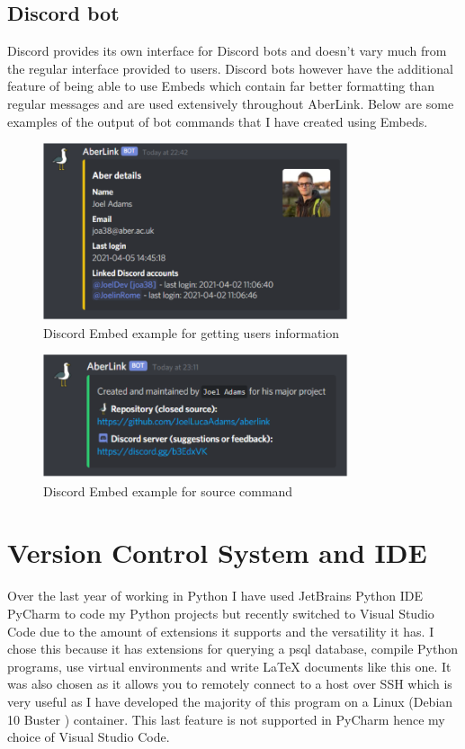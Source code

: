 \subsection{Discord bot}
Discord provides its own interface for Discord bots and doesn't vary much from the regular interface provided to users. Discord bots however have the additional feature of being able to use Embeds which contain far better formatting than regular messages and are used extensively throughout AberLink. Below are some examples of the output of bot commands that I have created using Embeds.
\begin{figure}[H]
	\centering
	\includegraphics[width=0.8\textwidth]{Figures/test-2}
	\caption{Discord Embed example for getting users information}
	\label{fig:dis-go}
\end{figure}
\begin{figure}[H]
	\centering
	\includegraphics[width=0.8\textwidth]{Figures/test}
	\caption{Discord Embed example for source command}
	\label{fig:dis-source}
\end{figure}

\section{Version Control System and IDE}

Over the last year of working in Python I have used JetBrains Python IDE PyCharm \cite{pycharm} to code my Python projects but recently switched to Visual Studio Code \cite{vsc} due to the amount of extensions it supports and the versatility it has. I chose this because it has extensions for querying a psql \cite{psql} database, compile Python programs, use virtual environments and write LaTeX documents like this one. It was also chosen as it allows you to remotely connect to a host over SSH which is very useful as I have developed the majority of this program on a Linux (Debian 10 Buster \cite{debian}) container. This last feature is not supported in PyCharm hence my choice of Visual Studio Code.

